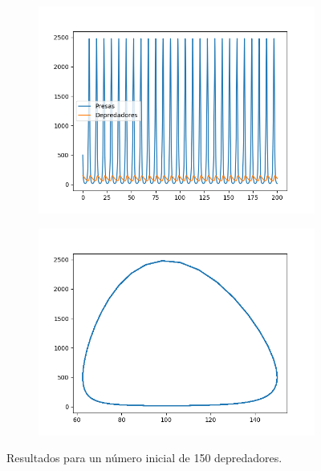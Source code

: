 \documentclass[11pt,a4paper]{article}
\begin{document}
\begin{figure}[H]
\centering
\begin{subfigure}{.5\textwidth}
	\centering
	\includegraphics[scale=0.45]{img/x500y150}
	\label{fig:y150}
\end{subfigure}%
\begin{subfigure}{.5\textwidth}
	\centering
	\includegraphics[scale=0.45]{img/circulo-y150}
	\label{fig:circ-y150}
\end{subfigure}
\caption{Resultados para un número inicial de 150 depredadores.}
\label{fig:dep}
\end{figure}
\end{document}
